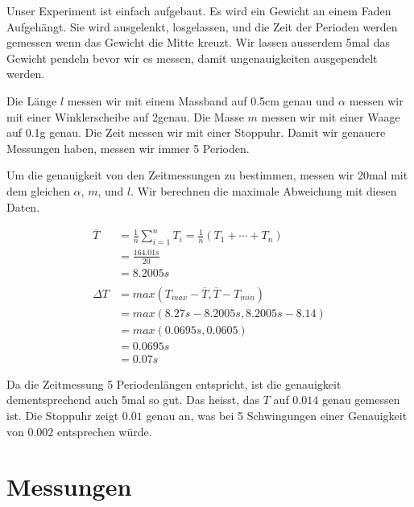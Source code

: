 \documentclass[12pt, a4paper, twoside]{article}
\begin{document}
Unser Experiment ist einfach aufgebaut.
Es wird ein Gewicht an einem Faden Aufgehängt.
Sie wird ausgelenkt, losgelassen, und die Zeit der Perioden werden gemessen wenn das Gewicht die Mitte kreuzt.
Wir lassen ausserdem 5mal das Gewicht pendeln bevor wir es messen, damit ungenauigkeiten ausgependelt werden.

Die Länge $l$ messen wir mit einem Massband auf 0.5cm genau und $\alpha$ messen wir mit einer Winklerscheibe auf 2\textdegree genau.
Die Masse $m$ messen wir mit einer Waage auf 0.1g genau.
Die Zeit messen wir mit einer Stoppuhr. Damit wir genauere Messungen haben, messen wir immer 5 Perioden.

Um die genauigkeit von den Zeitmessungen zu bestimmen, messen wir 20mal mit dem gleichen $\alpha$, $m$, und $l$.
Wir berechnen die maximale Abweichung mit diesen Daten.



\begin{align*}
  \overline{T} & = \frac{1}{n} \sum_{i=1}^{n} T_{i}=\frac{1}{n}\left(T_{1}+\cdots+T_{n}\right) \\
               & =\frac{164.01s}{20}                                                           \\
               & =8.2005s                                                                      \\
  \\
  \Delta T     & = max(T_{max} - \overline{T}, \overline{T} - T_{min})                         \\
               & = max(8.27s - 8.2005s, 8.2005s - 8.14)                                        \\
               & = max(0.0695s, 0.0605)                                                        \\
               & = 0.0695s                                                                     \\
               & = 0.07s
\end{align*}

Da die Zeitmessung 5 Periodenlängen entspricht, ist die genauigkeit dementsprechend auch 5mal so gut.
Das heisst, das $T$ auf $0.014$ genau gemessen ist.
Die Stoppuhr zeigt $0.01$ genau an, was bei 5 Schwingungen einer Genauigkeit von $0.002$ entsprechen würde.

\vfill\pagebreak

\section{Messungen}
\end{document}
